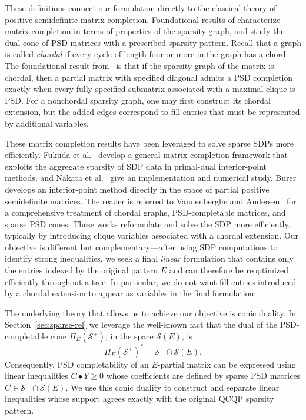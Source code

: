 \documentclass[twoside]{article}
\newcommand{\matip}[2]{#1 \bullet #2}
\newcommand{\citet}[1]{\cite{#1}}
\begin{document}
	These definitions connect our formulation directly to the classical theory of positive semidefinite matrix completion. Foundational results of \citet{grone.et.al:84} characterize matrix completion in terms of properties of the sparsity graph, and \citet{agler.et.al:88} study the dual cone of PSD matrices with a prescribed sparsity pattern.
	Recall that a graph is called \emph{chordal} if every cycle of length four or more in the graph has a chord.
	The foundational result from~\citet{grone.et.al:84} is that if the sparsity graph of the matrix is chordal, then a partial matrix with specified diagonal admits a PSD completion exactly when every fully specified submatrix associated with a maximal clique is PSD. For a nonchordal sparsity graph, one may first construct its chordal extension, but the added edges correspond to fill entries that must be represented by additional variables.
	
	These matrix completion results have been leveraged to solve sparse SDPs more efficiently. Fukuda et al.~\cite{fukudaetal2001} develop a general matrix-completion framework that exploits the aggregate sparsity of SDP data in primal-dual interior-point methods, and Nakata et al.~\cite{nakata.et.al:03} give an implementation and numerical study. Burer~\cite{burer2003} develops an interior-point method directly in the space of partial positive semidefinite matrices. The reader is referred to Vandenberghe and Andersen~\cite{vandenberghe.andersen:15} for a comprehensive treatment of chordal graphs, PSD-completable matrices, and sparse PSD cones. These works reformulate and solve the SDP more efficiently, typically by introducing clique variables associated with a chordal extension. Our objective is different but complementary---after using SDP computations to identify strong inequalities, we seek a final \emph{linear} formulation that contains only the entries indexed by the original pattern $E$ and can therefore be reoptimized efficiently throughout a \BnB tree.  In particular, we do not want fill entries introduced by a chordal extension to appear as variables in the final formulation.
	
	The underlying theory that allows us to achieve our objective is conic duality.  In Section~\ref{sec:sparse-rel} we leverage the well-known fact that the dual of the PSD-completable cone $\Pi_E(\mathcal S^+)$, in the space $\mathcal S(E)$, is
	\begin{equation}
		\label{eq:completion-duality}
		\Pi_E(\mathcal S^+)^* = \mathcal S^+ \cap \mathcal S(E).
	\end{equation}
	Consequently, PSD completability of an $E$-partial matrix can be expressed using linear inequalities $\matip{C}{Y} \geq 0$ whose coefficients are defined by sparse PSD matrices $C\in\mathcal S^+\cap\mathcal S(E)$.  We use this conic duality to construct and separate linear inequalities whose support agrees exactly with the original QCQP sparsity pattern.  
	
\end{document}
